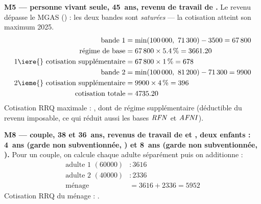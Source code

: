 \medskip\noindent\textbf{M5 --- personne vivant seule, 45~ans, revenu de travail de .}
Le revenu dépasse le MGAS () : les deux bandes sont
\emph{saturées} — la cotisation atteint son maximum 2025.
\begin{align*}
\text{bande 1} &= \min(\num{100000},\ \num{71300}) - \num{3500} = \num{67800} \\
\text{régime de base} &= \num{67800} \times \pc{5.4} = \num{3661.20} \\
\text{1\iere{} cotisation supplémentaire} &= \num{67800} \times \pc{1} = \num{678} \\
\text{bande 2} &= \min(\num{100000},\ \num{81200}) - \num{71300} = \num{9900} \\
\text{2\ieme{} cotisation supplémentaire} &= \num{9900} \times \pc{4} = \num{396} \\
\text{cotisation totale} &= \num{4735.20}
\end{align*}
Cotisation RRQ maximale : , dont  de régime
supplémentaire (déductible du revenu imposable, ce qui réduit aussi les bases
$\mathit{RFN}$ et $\mathit{AFNI}$).

\medskip\noindent\textbf{M8 --- couple, 38 et 36~ans, revenus de travail de  et , deux enfants : 4~ans (garde non subventionnée, ) et 8~ans (garde non subventionnée, ).}
Pour un couple, on calcule chaque adulte séparément puis on additionne :
\begin{align*}
\text{adulte 1 } (\num{60000}) &: \num{3616} \\
\text{adulte 2 } (\num{40000}) &: \num{2336} \\
\text{ménage} &= \num{3616} + \num{2336} = \num{5952}
\end{align*}
Cotisation RRQ du ménage : .
